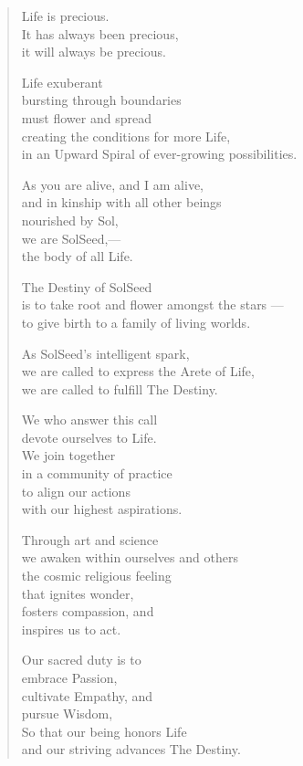 \documentclass[ebook,12pt,openany,twoside]{memoir}
\newcommand{\tab}{\hspace*{2em}}
\begin{document}
\begin{verse}
  Life is precious.\\
  \tab It has always been precious,\\
  \tab it will always be precious.

  Life exuberant\\
  bursting through boundaries\\
  must flower and spread\\
  \tab creating the conditions for more Life,\\
  \tab in an Upward Spiral of ever-growing possibilities.

  As you are alive, and I am alive,\\
  and in kinship with all other beings\\
  nourished by Sol,\\
  \tab we are SolSeed,--- \\
  \tab the body of all Life.

  The Destiny of SolSeed\\
  is to take root and flower amongst the stars ---\\
  \tab to give birth to a family of living worlds.

  As SolSeed's intelligent spark,\\
  \tab we are called to express the Arete of Life,\\
  \tab we are called to fulfill The Destiny.

  We who answer this call\\
  devote ourselves to Life.\\
  \tab We join together\\
  \tab in a community of practice\\
  \tab to align our actions\\
  \tab with our highest aspirations.

  Through art and science\\
  we awaken within ourselves and others\\
  \tab the cosmic religious feeling\\
  \tab that ignites wonder,\\
  \tab fosters compassion, and\\
  \tab inspires us to act.

  Our sacred duty is to\\
  embrace Passion,\\
  cultivate Empathy, and\\
  pursue Wisdom,\\
  \tab So that our being honors Life\\
  \tab and our striving advances The Destiny.


\end{verse}
\end{document}
